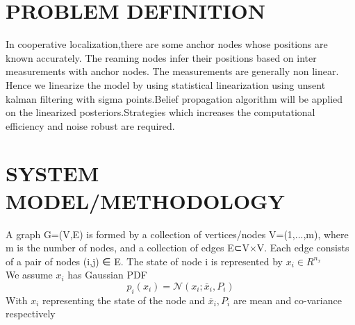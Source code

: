 \documentclass[12pt]{article}
\begin{document}
\section{PROBLEM DEFINITION}
In cooperative localization,there are some anchor nodes whose positions are known accurately. The reaming nodes infer their positions based on inter measurements with anchor nodes. The measurements are generally non linear. Hence we linearize the model by using statistical linearization using unsent kalman filtering with sigma points.Belief propagation algorithm will be applied on the linearized posteriors.Strategies which increases the computational efficiency and noise robust are required.
\section{SYSTEM MODEL/METHODOLOGY}
A graph G=(V,E) is formed by a collection of vertices/nodes V=(1,...,m), where m is the number of nodes, and a collection of edges E⊂V×V. Each edge consists of a pair of nodes (i,j) ∈ E. The state of node i is represented by $x_i∈R^{n_x}$\\

We assume $x_{i}$  has Gaussian PDF\\ 
 \begin{equation} 
p_{i}(x_{i}) =\mathcal {N}\left(x_{i};\overline{x}_{i},P_{i}\right)
\end{equation}
With $x_{i}$ representing the state of the node and  $\overline{x}_{i},P_{i}$ are mean and co-variance respectively\\
  
\end{document}
